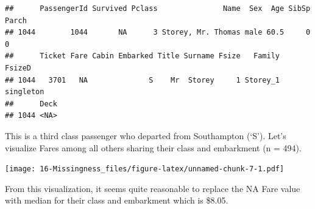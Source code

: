 \documentclass[]{book}
\newenvironment{Shaded}{\begin{snugshade}}{\end{snugshade}}
\newcommand{\KeywordTok}[1]{\textcolor[rgb]{0.13,0.29,0.53}{\textbf{#1}}}
\newcommand{\DataTypeTok}[1]{\textcolor[rgb]{0.13,0.29,0.53}{#1}}
\newcommand{\DecValTok}[1]{\textcolor[rgb]{0.00,0.00,0.81}{#1}}
\newcommand{\FloatTok}[1]{\textcolor[rgb]{0.00,0.00,0.81}{#1}}
\newcommand{\StringTok}[1]{\textcolor[rgb]{0.31,0.60,0.02}{#1}}
\newcommand{\CommentTok}[1]{\textcolor[rgb]{0.56,0.35,0.01}{\textit{#1}}}
\newcommand{\OtherTok}[1]{\textcolor[rgb]{0.56,0.35,0.01}{#1}}
\newcommand{\OperatorTok}[1]{\textcolor[rgb]{0.81,0.36,0.00}{\textbf{#1}}}
\newcommand{\NormalTok}[1]{#1}
\theoremstyle{definition}
\theoremstyle{definition}
\theoremstyle{definition}
\theoremstyle{remark}
\begin{document}
\begin{verbatim}
##      PassengerId Survived Pclass               Name  Sex  Age SibSp Parch
## 1044        1044       NA      3 Storey, Mr. Thomas male 60.5     0     0
##      Ticket Fare Cabin Embarked Title Surname Fsize   Family    FsizeD
## 1044   3701   NA              S    Mr  Storey     1 Storey_1 singleton
##      Deck
## 1044 <NA>
\end{verbatim}

This is a third class passenger who departed from Southampton (`S').
Let's visualize Fares among all others sharing their class and
embarkment (n = 494).

\begin{Shaded}
\end{Shaded}

\texttt{[image: 16-Missingness\_files/figure-latex/unnamed-chunk-7-1.pdf]}

From this visualization, it seems quite reasonable to replace the NA
Fare value with median for their class and embarkment which is \$8.05.

\begin{Shaded}
\end{Shaded}
\end{document}
